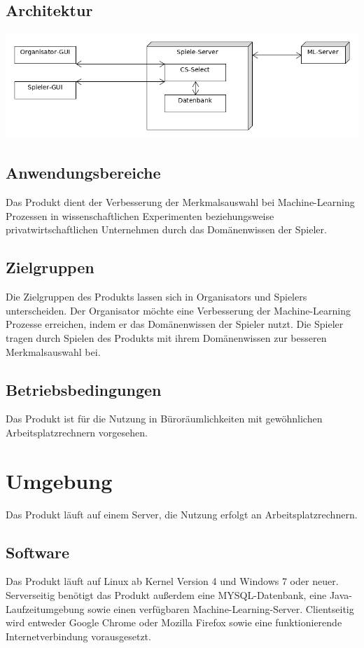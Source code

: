 \documentclass[a4paper]{scrreprt}
\begin{document}
    \section{Architektur}
    \includegraphics[width=\textwidth]{uml/export/Architektur.png}
    \section{Anwendungsbereiche}
    Das \Gls{Produkt} dient der Verbesserung der Merkmalsauswahl bei Machine-Learning Prozessen in wissenschaftlichen
    Experimenten beziehungsweise privatwirtschaftlichen Unternehmen durch das Domänenwissen der \Gls{Spieler}.

    \section{Zielgruppen}
    Die Zielgruppen des \Gls{Produkt}s lassen sich in \Glspl{Organisator} und \Glspl{Spieler} unterscheiden.
    Der Organisator möchte eine Verbesserung der Machine-Learning Prozesse erreichen, indem er das Domänenwissen der Spieler nutzt.
    Die Spieler tragen durch Spielen des \Gls{Produkt}s mit ihrem Domänenwissen zur besseren Merkmalsauswahl bei.

    \section{Betriebsbedingungen}
    Das \Gls{Produkt} ist für die Nutzung in Büroräumlichkeiten mit gewöhnlichen Arbeitsplatzrechnern vorgesehen.

    \chapter{Umgebung}
    Das \Gls{Produkt} läuft auf einem Server, die Nutzung erfolgt an Arbeitsplatzrechnern.

    \section{Software}
    Das \Gls{Produkt} läuft auf Linux ab Kernel Version 4 und Windows 7 oder neuer.
    Serverseitig benötigt das Produkt außerdem eine MYSQL-Datenbank, eine Java-Laufzeitumgebung sowie einen verfügbaren Machine-Learning-Server.
    Clientseitig wird entweder Google Chrome oder Mozilla Firefox sowie eine funktionierende Internetverbindung vorausgesetzt.
\end{document}

